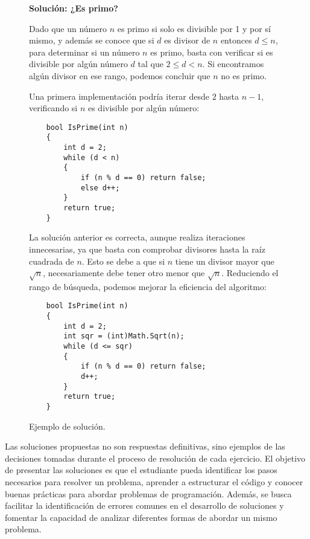\begin{figure}[h!]
    \centering
    \begin{minipage}{12cm}
    \begin{framed}
        \textbf{Solución: ¿Es primo?}

        Dado que un número \(n\) es primo si solo es divisible por 1 y por sí mismo, y además se conoce que si \(d\) es divisor de \(n\) entonces \(d \leq n\), para determinar si un número \(n\) es primo, basta con verificar si es divisible por algún número \(d\) tal que \(2 \leq d < n\). Si encontramos algún divisor en ese rango, podemos concluir que \(n\) no es primo.

        Una primera implementación podría iterar desde \(2\) hasta \(n - 1\), verificando si \(n\) es divisible por algún número:
      
    \begin{lstlisting}
    bool IsPrime(int n)
    {
        int d = 2;
        while (d < n)
        {
            if (n % d == 0) return false;
            else d++;
        }
        return true;
    }
    \end{lstlisting}
        
        La solución anterior es correcta, aunque realiza iteraciones innecesarias, ya que basta con comprobar divisores hasta la raíz cuadrada de \(n\). Esto se debe a que si \(n\) tiene un divisor mayor que \(\sqrt{n}\), necesariamente debe tener otro menor que \(\sqrt{n}\). Reduciendo el rango de búsqueda, podemos mejorar la eficiencia del algoritmo:
        
    \begin{lstlisting}
    bool IsPrime(int n)
    {
        int d = 2;
        int sqr = (int)Math.Sqrt(n);
        while (d <= sqr)
        {
            if (n % d == 0) return false;
            d++;
        }
        return true;
    }
    \end{lstlisting}
    \end{framed}
    \end{minipage}
\caption{Ejemplo de solución.}\label{fig:solution}
\end{figure}

Las soluciones propuestas no son respuestas definitivas, sino ejemplos de las decisiones tomadas durante el proceso de resolución de cada ejercicio. El objetivo de presentar las soluciones es que el estudiante pueda identificar los pasos necesarios para resolver un problema, aprender a estructurar el código y conocer buenas prácticas para abordar problemas de programación. Además, se busca facilitar la identificación de errores comunes en el desarrollo de soluciones y fomentar la capacidad de analizar diferentes formas de abordar un mismo problema.

